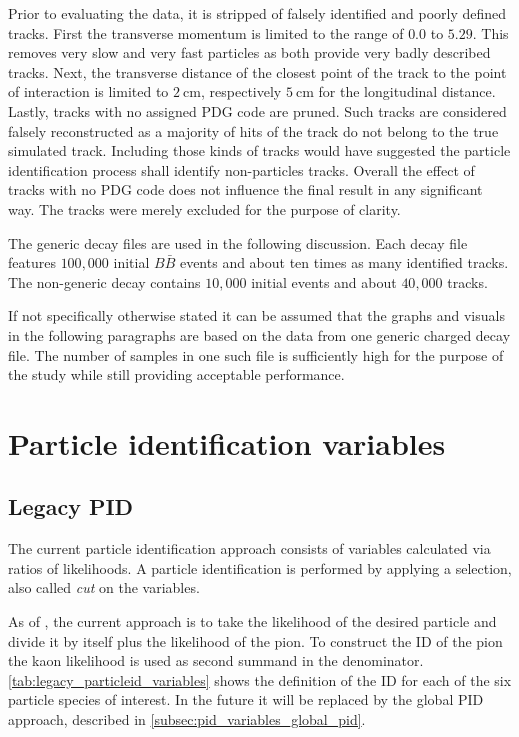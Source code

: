 Prior to evaluating the data, it is stripped of falsely identified and poorly defined tracks. First the transverse momentum is limited to the range of $0.0$ to $5.29$. This removes very slow and very fast particles as both provide very badly described tracks. Next, the transverse distance of the closest point of the track to the point of interaction is limited to $2 \mathrm{~cm}$, respectively $5 \mathrm{~cm}$ for the longitudinal distance. Lastly, tracks with no assigned PDG code are pruned. Such tracks are considered falsely reconstructed as a majority of hits of the track do not belong to the true simulated track. Including those kinds of tracks would have suggested the particle identification process shall identify non-particles tracks. Overall the effect of tracks with no PDG code does not influence the final result in any significant way. The tracks were merely excluded for the purpose of clarity.

The generic decay files are used in the following discussion. Each decay file features $100,000$ initial $B \bar{B}$ events and about ten times as many identified tracks. The non-generic decay contains $10,000$ initial events and about $40,000$ tracks.

If not specifically otherwise stated it can be assumed that the graphs and visuals in the following paragraphs are based on the data from one generic charged decay file. The number of samples in one such file is sufficiently high for the purpose of the study while still providing acceptable performance.

\section{Particle identification variables}
\label{sec:pid_variables}

\subsection{Legacy PID}
\label{subsec:pid_variables_legacy_pid}

The current particle identification approach consists of variables calculated via ratios of likelihoods. A particle identification is performed by applying a selection, also called \textit{cut} on the variables.

As of , the current approach is to take the likelihood of the desired particle and divide it by itself plus the likelihood of the pion. To construct the ID of the pion the kaon likelihood is used as second summand in the denominator. \autoref{tab:legacy_particleid_variables} shows the definition of the ID for each of the six particle species of interest. In the future it will be replaced by the global PID approach, described in \autoref{subsec:pid_variables_global_pid}.

